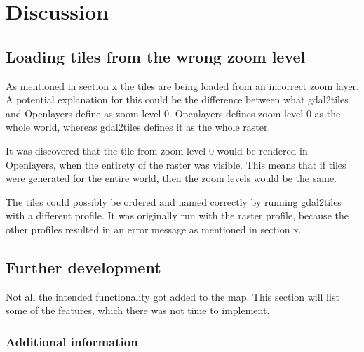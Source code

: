 \chapter{Discussion}


\section{Loading tiles from the wrong zoom level}

As mentioned in section x the tiles are being loaded from an incorrect zoom layer. A potential explanation for this could be the difference between what gdal2tiles and Openlayers define as zoom level 0. Openlayers defines zoom level 0 as the whole world, whereas gdal2tiles defines it as the whole raster. 

It was discovered that the tile from zoom level 0 would be rendered in Openlayers, when the entirety of the raster was visible. This means that if tiles were generated for the entire world, then the zoom levels would be the same. 

The tiles could possibly be ordered and named correctly by running gdal2tiles with a different profile.  It was originally run with the raster profile, because the other profiles resulted in an error message as mentioned in section x. 


\section{Further development}
Not all the intended functionality got added to the map. This section will list some of the features, which there was not time to implement. 
%

\subsection{Additional information}\label{MoreInfoPlz}


